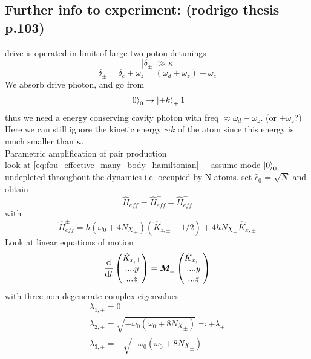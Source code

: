 \subsection{Further info to experiment: (rodrigo thesis p.103)}
drive is operated in limit of large two-poton  detunings
\begin{equation}
	|\delta_\pm| \gg \kappa
\end{equation}
\begin{equation}
	\delta_\pm = \delta_c \pm \omega_z = (\omega_d \pm \omega_z) - \omega_c
\end{equation}
We absorb drive photon, and go from 
\begin{equation}
	\ket{0}_0 \rightarrow \ket{+k}_+1
\end{equation}
thus we need a energy conserving cavity photon with freq $\approx \omega_d - \omega_z$. (or $+\omega_z$?) Here we can still ignore the kinetic energy $\sim k$ of the atom since this energy is much smaller than $\kappa$.
\\ 
Parametric amplification of pair production
\\
look at \ref{eq:fou_effective_many_body_hamiltonian} + assume mode $\ket{0}_0$ undepleted throughout the dynamics i.e. occupied by N atoms. set $\hat{c}_0$ = $\sqrt{N}$ and obtain
\begin{equation}
	\hat{H}_{eff} = \hat{H}^+_{eff} + \hat{H}^-_{eff}
\end{equation}
with 
\begin{equation}
	\hat{H}^\pm_{eff} = \hbar (\omega_0 + 4 N \chi_\pm)(\hat{K}_{z,\pm}-1/2) + 4 \hbar N \chi_\pm \hat{K}_{x,\pm}
\end{equation}
Look at linear equations of motion
\begin{equation}\label{eq:fou_time_development_linear_K}
	\frac{\mathrm{d}}{\mathrm{d}t}\left( 
	\begin{matrix}
		\hat{K}_{x,\pm}
		\\
		....y
		\\
		...z
	\end{matrix}\right) = \bm{M}_\pm 
	\left( \begin{matrix}
	\hat{K}_{x,\pm}
	\\
	....y
	\\
	...z
	\end{matrix}\right)	
\end{equation}
with three non-degenerate complex eigenvalues
\begin{align}
	\lambda_{1,\pm} = 0 
	\\
	\lambda_{2,\pm} = \sqrt{-\omega_0(\omega_0 + 8 N \chi_\pm)} \eqcolon + \lambda_\pm
	\\
	\lambda_{3,\pm} = - \sqrt{- \omega_0 (\omega_0+8N \chi_\pm)}
\end{align}
